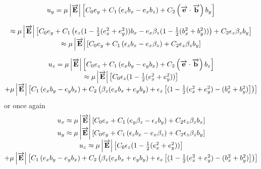 \documentclass[12pt]{article} %
\begin{document}
\begin{equation}  %
\begin{matrix}
u_{y} = 
\mu \left| \overrightarrow{ \mathbf{E} }\right| 
\left[ C_{0} e_{y} + C_{1} \left(e_{z} b_{x} - e_{x} b_{z}\right) + C_{2} \left( \overrightarrow{\mathbf{e}} \cdot  \overrightarrow{\mathbf{b}} \right) b_{y} \right] \cr
\cr
\approx
\mu \left| \overrightarrow{ \mathbf{E} }\right| 
\left[ C_{0} e_{y} 
 + C_{1} \left(  \epsilon_{z}  (1 - \frac{1}{2}( e_{x}^2 + e_{y}^2)) b_{x} - e_{x} \beta_{z}     (1 - \frac{1}{2}( b_{x}^2 + b_{y}^2)) \right)
 + C_{2} \epsilon_{z}  \beta_{z} b_{y} 
\right]
\cr
\approx
\mu \left| \overrightarrow{ \mathbf{E} }\right| 
\left[ C_{0} e_{y} 
 + C_{1} \left(  \epsilon_{z} b_{x} - e_{x} \beta_{z} \right)
 + C_{2} \epsilon_{z}  \beta_{z} b_{y} 
\right]
\cr
\end{matrix}
\end{equation}

\begin{equation}  %
\begin{matrix}
u_{z} = 
\mu \left| \overrightarrow{ \mathbf{E} }\right| 
\left[ C_{0} e_{z} 
+ C_{1} \left(e_{x} b_{y} - e_{y} b_{x}\right) + C_{2} \left( \overrightarrow{\mathbf{e}} \cdot  \overrightarrow{\mathbf{b}} \right) b_{z}
\right]
\cr
\approx
\mu \left| \overrightarrow{ \mathbf{E} }\right| 
\left[ 
  C_{0}   \epsilon_{z}  (1 - \frac{1}{2}( e_{x}^2 + e_{y}^2))
\right]
\cr
+ \mu \left| \overrightarrow{ \mathbf{E} }\right| 
\left[
C_{1} 
\left(
e_{x} b_{y} - e_{y} b_{x} 
\right) 
+ C_{2} 
\left( 
\beta_{z} (e_{x} b_{x} + e_{y} b_{y}) + \epsilon_{z} \left[ (1  - \frac{1}{2}(e_{x}^2 + e_{y}^2) - ( b_{x}^2 + b_{y}^2) \right]
\right)
\right]
\cr
\end{matrix}
\end{equation}
or once again
\begin{equation}  %
\begin{matrix}
u_{x} \approx
\mu \left| \overrightarrow{ \mathbf{E} }\right| 
\left[ C_{0} e_{x}
 + C_{1} \left( e_{y} \beta_{z}  - \epsilon_{z}  b_{y}\right)
 + C_{2} \epsilon_{z}  \beta_{z} b_{x}
\right]
\cr
u_{y} \approx
\mu \left| \overrightarrow{ \mathbf{E} }\right| 
\left[ C_{0} e_{y} 
 + C_{1} \left(  \epsilon_{z} b_{x} - e_{x} \beta_{z} \right)
 + C_{2} \epsilon_{z}  \beta_{z} b_{y} 
\right]
\cr
u_{z} 
\approx
\mu \left| \overrightarrow{ \mathbf{E} }\right| 
\left[ 
  C_{0}   \epsilon_{z}  (1 - \frac{1}{2}( e_{x}^2 + e_{y}^2))
\right]
\cr
+ \mu \left| \overrightarrow{ \mathbf{E} }\right| 
\left[
C_{1} 
\left(
e_{x} b_{y} - e_{y} b_{x} 
\right) 
+ C_{2} 
\left( 
\beta_{z} (e_{x} b_{x} + e_{y} b_{y}) + \epsilon_{z} \left[ (1  - \frac{1}{2}(e_{x}^2 + e_{y}^2) - ( b_{x}^2 + b_{y}^2) \right]
\right)
\right]
\cr
\end{matrix}
\end{equation}
\end{document}
